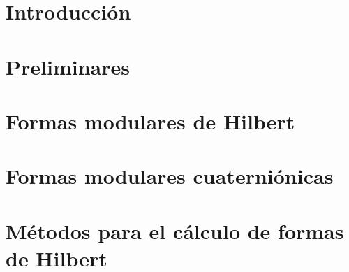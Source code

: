 \chapter{Introducci\'{o}n}\label{cap:intro}



\chapter{Preliminares}\label{cap:preliminares}


\chapter{Formas modulares de Hilbert}\label{cap:dehilbert}


\chapter{Formas modulares cuaterni\'{o}nicas}\label{cap:cuaternionicas}


\chapter{M\'{e}todos para el c\'{a}lculo de formas de Hilbert}%
	\label{cap:metodos}




\printbibliography[heading=bibintoc,title=\bibname]
